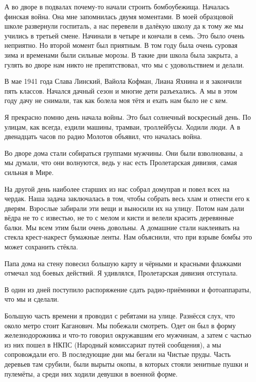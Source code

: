 А во дворе в подвалах почему-то начали строить бомбоубежища. Началась финская война. Она мне запомнилась двумя моментами. В моей образцовой школе развернули госпиталь, а нас перевели в далёкую школу да к тому же мы учились в третьей смене. Начинали в четыре и кончали в семь. Это было очень неприятно. Но второй момент был приятным. В том году была очень суровая зима и временами были сильные морозы. В такие дни школа была закрыта, а гулять во дворе нам никто не препятствовал, что мы с удовольствием и делали.

В мае 1941 года Слава Линский, Вайола Кофман, Лиана Яхнина и я закончили пять классов. Начался дачный сезон и многие дети разъехались. А мы в этом году дачу не снимали, так как болела моя тётя и ехать нам было не с кем.

Я прекрасно помню день начала войны. Это был солнечный воскресный день. По улицам, как всегда, ездили машины, трамваи, троллейбусы. Ходили люди. А в двенадцать часов по радио Молотов объявил, что началась война.

Во дворе дома стали собираться группами мужчины. Они были взволнованы, а мы думали, что они волнуются, ведь у нас есть Пролетарская дивизия, самая сильная в Мире.

На другой день наиболее старших из нас собрал домуправ и повел всех на чердак. Наша задача заключалась в том, чтобы собрать весь хлам и отнести его к дверям. Взрослые забирали эти вещи и выносили их на улицу. Потом нам дали вёдра не то с известью, не то с мелом и кисти и велели красить деревянные балки. Мы всем этим были очень довольны. А домашние стали наклеивать на стекла крест-накрест бумажные ленты. Нам объяснили, что при взрыве бомбы это может сохранить стёкла.

Папа дома на стену повесил большую карту и чёрными и красными флажками отмечал ход боевых действий. Я удивлялся, Пролетарская дивизия отступала.

В один из дней поступило распоряжение сдать радио-приёмники и фотоаппараты, что мы и сделали.

Большую часть времени я проводил с ребятами на улице. Разнёсся слух, что около метро стоит Каганович. Мы побежали смотреть. Одет он был в форму железнодорожника и что-то говорил окружавшим его мужчинам, а затем с частью из них пошел в НКПС (Народный комиссариат путей сообщения), а мы сопровождали его. В последующие дни мы бегали на Чистые пруды. Часть деревьев там срубили, были вырыты окопы, в которых стояли зенитные пушки и пулемёты, а среди них ходили девушки в военной форме.

